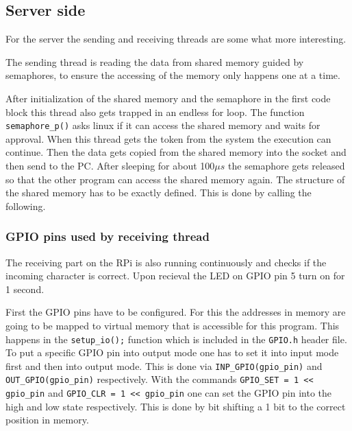 \documentclass[12pt,paper=a4,twoside]{scrartcl}
\numberwithin{equation}{section}
\begin{document}
\subsection{Server side}
For the server the sending and receiving threads are some what more interesting.

The sending thread is reading the data from shared memory guided by semaphores, to ensure the accessing of the memory only happens one at a time.


After initialization of the shared memory and the semaphore in the first code block this thread also gets trapped in an endless for loop. The function \verb+semaphore_p()+ asks linux if it can access the shared memory and waits for approval. When this thread gets the token from the system the execution can continue. Then the data gets copied from the shared memory into the socket and then send to the PC. After sleeping for about 100$\mu s$ the semaphore gets released so that the other program can access the shared memory again.
The structure of the shared memory has to be exactly defined. This is done by calling the following.

\subsubsection{GPIO pins used by receiving thread}
The receiving part on the RPi is also running continuously and checks if the incoming character is correct. Upon recieval the LED on GPIO pin 5 turn on for 1 second.

First the GPIO pins have to be configured. For this the addresses in memory are going to be mapped to virtual memory that is accessible for this program. This happens in the \verb+setup_io();+ function which is included in the \verb+GPIO.h+ header file. To put a specific GPIO pin into output mode one has to set it into input mode first and then into output mode. This is done via \verb+INP_GPIO(gpio_pin)+ and \verb+OUT_GPIO(gpio_pin)+ respectively. With the commands \verb+GPIO_SET = 1 << gpio_pin+ and \verb+GPIO_CLR = 1 << gpio_pin+ one can set the GPIO pin into the high and low state respectively. This is done by bit shifting a 1 bit to the correct position in memory.
\end{document}
